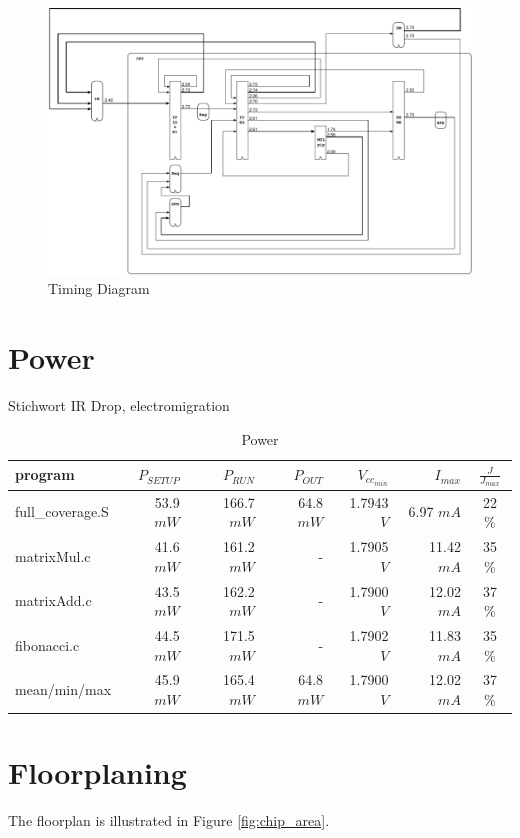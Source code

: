 \begin{landscape}
\begin{figure}[htbp]
  \centering
  \includegraphics[width=\linewidth]{./figures/timing_diagram}
  \caption{Timing Diagram}
  \label{fig:timing}
\end{figure}

\end{landscape}

\section{Power}
Stichwort IR Drop, electromigration
\begin{table}[htbp]
 \caption{Power}
 \label{tab:power}
 \centering\begin{tabular}{|l|r|r|r||r||r|c|} \hline
program & $P_{SETUP}$ & $P_{RUN}$ & $P_{OUT}$ & $V_{cc_{min}}$ & $I_{max}$ & $\frac{J}{J_{max}}$ \\ \hline
full\_coverage.S & 53.9 $mW$ & 166.7 $mW$ & 64.8 $mW$ & 1.7943 $V$ & 6.97 $mA$ & 22 \% \\ \hline
matrixMul.c & 41.6 $mW$ & 161.2 $mW$ & - & 1.7905 $V$ & 11.42 $mA$ & 35 \% \\ \hline
matrixAdd.c & 43.5 $mW$ & 162.2 $mW$ & - & 1.7900 $V$ & 12.02 $mA$ & 37 \% \\ \hline
fibonacci.c & 44.5 $mW$ & 171.5 $mW$ & - & 1.7902 $V$ & 11.83 $mA$ & 35 \% \\ \hline \hline
mean/min/max & 45.9 $mW$ & 165.4 $mW$ & 64.8 $mW$ & 1.7900 $V$ & 12.02 $mA$ & 37 \%  \\ \hline
 \end{tabular}
\end{table}


\section{Floorplaning}
The floorplan is illustrated in Figure \ref{fig:chip_area}.
